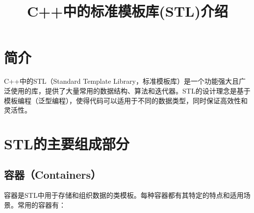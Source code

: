 \documentclass{article}
\title{C++中的标准模板库(STL)介绍}
\author{}
\date{}
\begin{document}
\maketitle

\section{简介}
C++中的STL（Standard Template Library，标准模板库）是一个功能强大且广泛使用的库，提供了大量常用的数据结构、算法和迭代器。STL的设计理念是基于模板编程（泛型编程），使得代码可以适用于不同的数据类型，同时保证高效性和灵活性。

\section{STL的主要组成部分}

\subsection{容器（Containers）}
容器是STL中用于存储和组织数据的类模板。每种容器都有其特定的特点和适用场景。常用的容器有：
\end{document}
